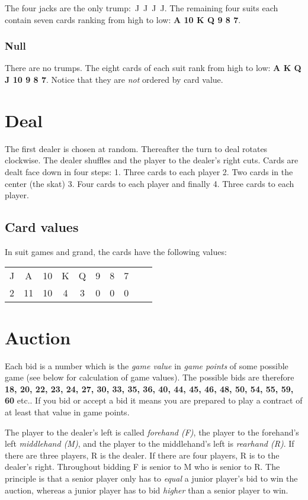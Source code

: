 \documentclass[letter]{article}
\newcommand{\clubs}{{\larger[2]\Pisymbol{psy}{"A7}}}
\newcommand{\spades}{{\larger[2]\Pisymbol{psy}{"AA}}}
\newcommand{\hearts}{{\larger[2]\color{red}\Pisymbol{psy}{"A9}}}
\newcommand{\diamonds}{{\larger[2]\color{red}\Pisymbol{psy}{"A8}}}
\newcommand{\clubsX}[1]{\clubs\,#1}
\newcommand{\spadesX}[1]{\spades\,#1}
\newcommand{\heartsX}[1]{\hearts\,#1}
\newcommand{\diamondsX}[1]{\diamonds\,#1}
\newcommand{\trumpjacks}{\clubsX{J} \spadesX{J} \heartsX{J} \diamondsX{J}}
\newcommand{\nonjackcards}{{\bfseries A 10 K Q 9 8 7}}
\newcommand{\cards}{{\bfseries A K Q J 10 9 8 7}}
\newcommand{\bids}{{\bfseries18, 20, 22, 23, 24, 27, 30, 33, 35, 36, 40, 44,
    45, 46, 48, 50, 54, 55, 59, 60} etc.}
\begin{document}
  The four jacks are the only trump: \trumpjacks. The remaining four suits each
  contain seven cards ranking from high to low: \nonjackcards.

  \subsubsection*{Null}

  There are no trumps. The eight cards of each suit rank from high to low:
  \cards. Notice that they are \emph{not} ordered by card value.

  \section*{Deal}

  The first dealer is chosen at random. Thereafter the turn to deal rotates
  clockwise. The dealer shuffles and the player to the dealer's right cuts.
  Cards are dealt face down in four steps: 1. Three cards to each player 2. Two
  cards in the center (the skat) 3. Four cards to each player and finally 4.
  Three cards to each player.

  \subsection*{Card values}

  In suit games and grand, the cards have the following values:

  {\bfseries
    \begin{tabular}{c c c c c c c c c c}
      J &  A & 10 & K & Q & 9 & 8 & 7 \\
      2 & 11 & 10 & 4 & 3 & 0 & 0 & 0 \\
    \end{tabular}
  }

  \section*{Auction}

  Each bid is a number which is the \emph{game value} in \emph{game points} of
  some possible game (see below for calculation of game values). The possible
  bids are therefore \bids. If you bid or accept a bid it means you are prepared
  to play a contract of at least that value in game points.

  The player to the dealer's left is called \emph{forehand (F)}, the player to
  the forehand's left \emph{middlehand (M)}, and the player to the middlehand's
  left is \emph{rearhand (R)}. If there are three players, R is the dealer. If
  there are four players, R is to the dealer's right. Throughout bidding F is
  senior to M who is senior to R. The principle is that a senior player only has
  to \emph{equal} a junior player's bid to win the auction, whereas a junior
  player has to bid \emph{higher} than a senior player to win.
\end{document}
